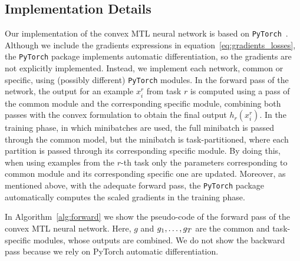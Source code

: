 



\subsection{Implementation Details}

Our implementation of the convex MTL neural network is based on \texttt{PyTorch}~\citep{PyTorch}.
Although we include the gradients expressions in equation~\eqref{eq:gradients_losses}, the \texttt{PyTorch} package implements automatic differentiation, so the gradients are not explicitly implemented.
Instead, we implement each network, common or specific, using (possibly different) \texttt{PyTorch} modules.
In the forward pass of the network, the output for an example $x_i^r$ from task $r$ is computed using a pass of the common module and the corresponding specific module, combining both passes with the convex formulation to obtain the final output $h_r(x_i^r)$.
In the training phase, in which minibatches are used, the full minibatch is passed through the common model, but the minibatch is task-partitioned, where each partition is passed through its corresponding specific module.
By doing this, when using examples from the $r$-th task only the parameters corresponding to common module and its corresponding specific one are updated.
Moreover, as mentioned above, with the adequate forward pass, the \texttt{PyTorch} package automatically computes the scaled gradients in the training phase.

{In Algorithm~\ref{alg:forward} we show the pseudo-code of the forward pass of the convex MTL neural network. Here, $g$ and $g_1, \ldots, g_T$ are the common and task-specific modules, whose outputs are combined. We do not show the backward pass because we rely on PyTorch automatic differentiation.}

